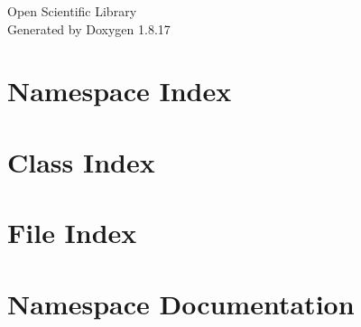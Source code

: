 \let\mypdfximage\pdfximage\def\pdfximage{\immediate\mypdfximage}\documentclass[twoside]{book}
\newcommand{\+}{\discretionary{\mbox{\scriptsize$\hookleftarrow$}}{}{}}
\newcommand{\clearemptydoublepage}{%
  \newpage{\pagestyle{empty}\cleardoublepage}%
}
\begin{document}
\hypersetup{pageanchor=false,
             bookmarksnumbered=true,
             pdfencoding=unicode
            }
\begin{titlepage}
\vspace*{7cm}
\begin{center}%
{\Large Open Scientific Library }\\
\vspace*{1cm}
{\large Generated by Doxygen 1.8.17}\\
\end{center}
\end{titlepage}
\clearemptydoublepage
{}
\tableofcontents
\clearemptydoublepage
{}
\hypersetup{pageanchor=true}

\chapter{Namespace Index}

\chapter{Class Index}

\chapter{File Index}

\chapter{Namespace Documentation}











\end{document}
